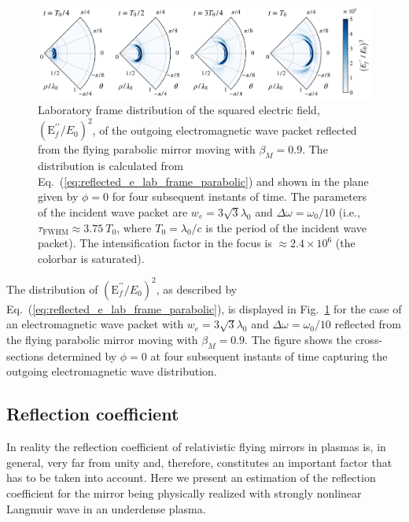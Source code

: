 \documentclass[10pt, a4paper, twoside, openright]{report}
\renewcommand{\vec}[1]{\boldsymbol{\mathrm{#1}}}
\begin{document}
\begin{figure}[t]
	\includegraphics[width=1\linewidth]{img/rfm_focus.png}
	\caption[]{\label{fig:rfm_focus} Laboratory frame distribution of the squared electric field, $ \left( \vec{E}^{\prime \prime}_{f} / E_0 \right)^2 $, of the outgoing electromagnetic wave packet reflected from the flying parabolic mirror moving with $ \beta_M = 0.9 $. The distribution is calculated from Eq.~(\ref{eq:reflected_e_lab_frame_parabolic}) and shown in the plane given by $ \phi = 0 $ for four subsequent instants of time. The parameters of the incident wave packet are $ w_e = 3 \sqrt{3} \lambda_0 $ and $ \Delta \omega = \omega_0 / 10 $ (i.e., $ \tau_{\mathrm{FWHM}} \approx 3.75 \ T_0 $, where $ T_0 = \lambda_0 / c $ is the period of the incident wave packet). The intensification factor in the focus is $ \approx 2.4 \times 10^6 $ (the colorbar is saturated).}
\end{figure}

The distribution of $ \left( \vec{E}^{\prime \prime}_{f} / E_0 \right)^2 $, as described by Eq.~(\ref{eq:reflected_e_lab_frame_parabolic}), is displayed in Fig.~\ref{fig:rfm_focus} for the case of an electromagnetic wave packet with $ w_e = 3 \sqrt{3} \lambda_0 $ and $ \Delta \omega = \omega_0 / 10 $ reflected from the flying parabolic mirror moving with $ \beta_M = 0.9 $. The figure shows the cross-sections determined by $ \phi = 0 $ at four subsequent instants of time capturing the outgoing electromagnetic wave distribution.

\subsection{Reflection coefficient}


In reality the reflection coefficient of relativistic flying mirrors in plasmas is, in general, very far from unity and, therefore, constitutes an important factor that has to be taken into account. Here we present an estimation of the reflection coefficient for the mirror being physically realized with strongly nonlinear Langmuir wave in an underdense plasma.
\end{document}
